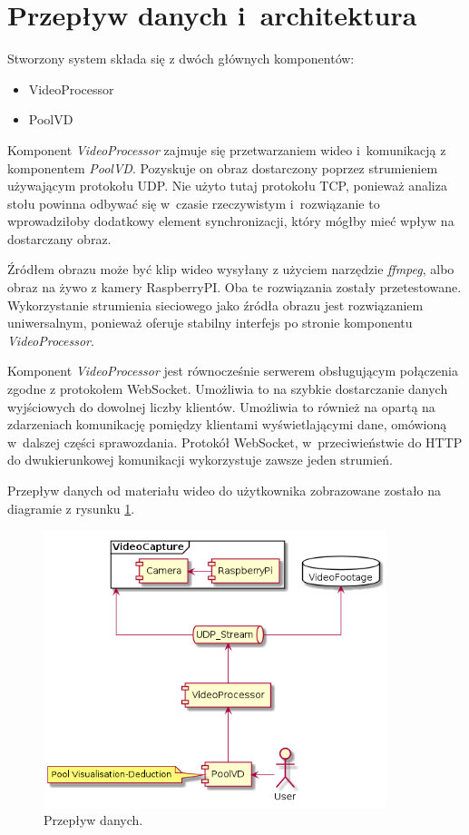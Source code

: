 \documentclass[12pt]{article}
\begin{document}
\section{Przepływ danych i~architektura}

Stworzony system składa się z dwóch głównych komponentów:
\begin{itemize}[noitemsep]
    \item VideoProcessor
    \item PoolVD
\end{itemize}

Komponent \textit{VideoProcessor} zajmuje się przetwarzaniem wideo i~komunikacją z komponentem \textit{PoolVD}. Pozyskuje on obraz dostarczony poprzez strumieniem używającym protokołu UDP. Nie użyto tutaj protokołu TCP, ponieważ analiza stołu powinna odbywać się w~czasie rzeczywistym i~rozwiązanie to wprowadziłoby dodatkowy element synchronizacji, który mógłby mieć wpływ na dostarczany obraz.

Źródłem obrazu może być klip wideo wysyłany z użyciem narzędzie \textit{ffmpeg}, albo obraz na żywo z kamery RaspberryPI. Oba te rozwiązania zostały przetestowane. Wykorzystanie strumienia sieciowego jako źródła obrazu jest rozwiązaniem uniwersalnym, ponieważ oferuje stabilny interfejs po stronie komponentu \textit{VideoProcessor}.

Komponent \textit{VideoProcessor} jest równocześnie serwerem obsługującym połączenia zgodne z protokołem WebSocket. Umożliwia to na szybkie dostarczanie danych wyjściowych do dowolnej liczby klientów. Umożliwia to również na opartą na zdarzeniach komunikację pomiędzy klientami wyświetlającymi dane, omówioną w~dalszej części sprawozdania. Protokół WebSocket, w~przeciwieństwie do HTTP do dwukierunkowej komunikacji wykorzystuje zawsze jeden strumień.

Przepływ danych od materiału wideo do użytkownika zobrazowane zostało na diagramie z rysunku \ref{dataflow}.


\begin{figure}[!htb]
    \centering
    \includegraphics[width=10cm]{./diagrams/out/data_flow.png}
    \caption{Przepływ danych.}
    \label{dataflow}
\end{figure}
\end{document}
